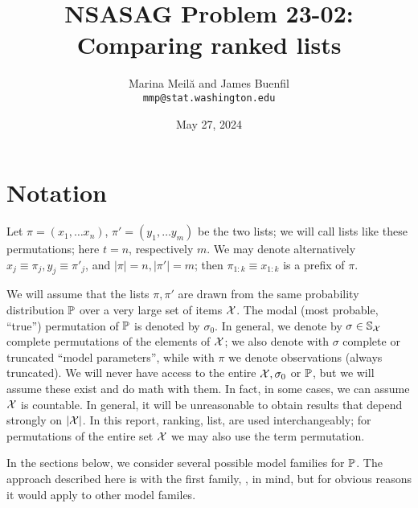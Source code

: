 \documentclass[10pt]{article}
\title{NSASAG Problem 23-02: Comparing ranked lists}
\author{Marina Meil\u{a} and James Buenfil\\{\tt mmp@stat.washington.edu}}
\date{May 27, 2024}
\begin{document}
\maketitle

\section{Notation}
\label{sec:notation}

Let $\pi=(x_1,\ldots x_n)$, $\pi'=(y_1,\ldots y_m)$ be the two lists; we will call lists like these \topt permutations; here $t=n$, respectively $m$. We may denote alternatively $x_j\equiv \pi_j, y_j\equiv \pi'_j$, and $|\pi|=n,|\pi'|=m$; then $\pi_{1:k}\equiv x_{1:k}$ is a prefix of $\pi$.%

We will assume that the lists $\pi,\pi'$ are drawn from the same probability
distribution ${\mathbb P}$ over a very large set of items ${\mathcal X}$. The modal
 (most probable, ``true'') permutation of ${\mathbb P}$ is
denoted by $\sigma_0$. In general, we denote by $\sigma\in {\mathbb S}_{{\mathcal X}}$
complete permutations of the elements of ${\mathcal X}$; we also denote with $\sigma$ complete or truncated ``model parameters'', while with $\pi$ we denote observations (always truncated). We will never have access to the entire ${\mathcal X},\sigma_0$ or ${\mathbb P}$, but we will assume these exist and do math with them. In fact, in some cases, we can assume ${\mathcal X}$ is countable. In general, it will be unreasonable to obtain results that depend strongly on $|{\mathcal X}|$. 
 In this report, ranking, list, are used interchangeably; for permutations of the entire set ${\mathcal X}$ we may also use the term permutation.

In the sections below, we consider several possible model families for ${\mathbb P}$. The approach described here is with the first family, \gmms, in mind, but for obvious reasons it would apply to other model familes.
\end{document}
